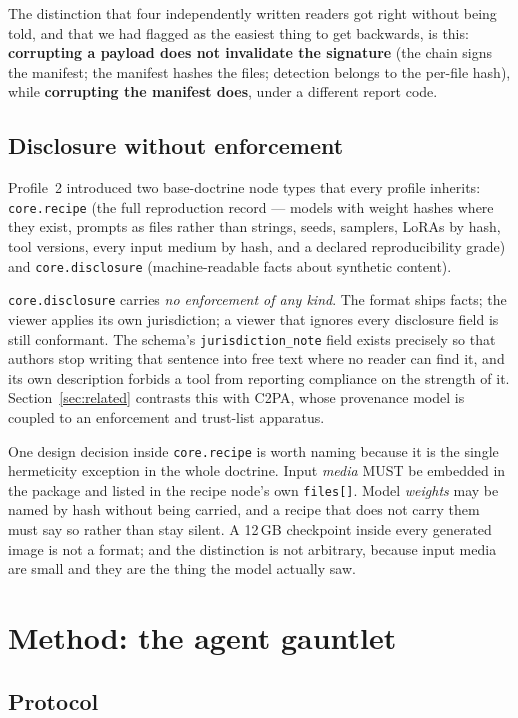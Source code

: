 \documentclass[10pt,twocolumn,letterpaper]{article}
\newcommand{\code}[1]{\texttt{\small #1}}
\begin{document}
The distinction that four independently written readers got right without being
told, and that we had flagged as the easiest thing to get backwards, is this:
\textbf{corrupting a payload does not invalidate the signature} (the chain signs
the manifest; the manifest hashes the files; detection belongs to the per-file
hash), while \textbf{corrupting the manifest does}, under a different report code.

\subsection{Disclosure without enforcement}

Profile~2 introduced two base-doctrine node types that every profile inherits:
\code{core.recipe} (the full reproduction record --- models with weight hashes
where they exist, prompts as files rather than strings, seeds, samplers, LoRAs by
hash, tool versions, every input medium by hash, and a declared reproducibility
grade) and \code{core.disclosure} (machine-readable facts about synthetic
content).

\code{core.disclosure} carries \emph{no enforcement of any kind}. The format ships
facts; the viewer applies its own jurisdiction; a viewer that ignores every
disclosure field is still conformant. The schema's \code{jurisdiction\_note} field
exists precisely so that authors stop writing that sentence into free text where
no reader can find it, and its own description forbids a tool from reporting
compliance on the strength of it. Section~\ref{sec:related} contrasts this with
C2PA, whose provenance model is coupled to an enforcement and trust-list
apparatus.

One design decision inside \code{core.recipe} is worth naming because it is the
single hermeticity exception in the whole doctrine. Input \emph{media} MUST be
embedded in the package and listed in the recipe node's own \code{files[]}. Model
\emph{weights} may be named by hash without being carried, and a recipe that does
not carry them must say so rather than stay silent. A 12\,GB checkpoint inside
every generated image is not a format; and the distinction is not arbitrary,
because input media are small and they are the thing the model actually saw.

\section{Method: the agent gauntlet}
\label{sec:method}

\subsection{Protocol}
\end{document}
